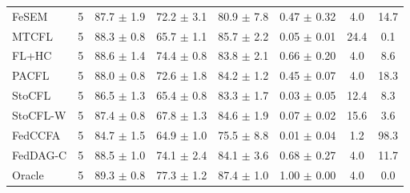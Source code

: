{\begin{tabular}{l r c c c c c c}
FeSEM & 5 & 87.7 $\pm$ 1.9 & 72.2 $\pm$ 3.1 & 80.9 $\pm$ 7.8 & 0.47 $\pm$ 0.32 & 4.0 & 14.7 \\
MTCFL & 5 & 88.3 $\pm$ 0.8 & 65.7 $\pm$ 1.1 & 85.7 $\pm$ 2.2 & 0.05 $\pm$ 0.01 & 24.4 & 0.1 \\
FL+HC & 5 & 88.6 $\pm$ 1.4 & 74.4 $\pm$ 0.8 & 83.8 $\pm$ 2.1 & 0.66 $\pm$ 0.20 & 4.0 & 8.6 \\
PACFL & 5 & 88.0 $\pm$ 0.8 & 72.6 $\pm$ 1.8 & 84.2 $\pm$ 1.2 & 0.45 $\pm$ 0.07 & 4.0 & 18.3 \\
StoCFL & 5 & 86.5 $\pm$ 1.3 & 65.4 $\pm$ 0.8 & 83.3 $\pm$ 1.7 & 0.03 $\pm$ 0.05 & 12.4 & 8.3 \\
StoCFL-W & 5 & 87.4 $\pm$ 0.8 & 67.8 $\pm$ 1.3 & 84.6 $\pm$ 1.9 & 0.07 $\pm$ 0.02 & 15.6 & 3.6 \\
FedCCFA & 5 & 84.7 $\pm$ 1.5 & 64.9 $\pm$ 1.0 & 75.5 $\pm$ 8.8 & 0.01 $\pm$ 0.04 & 1.2 & 98.3 \\
FedDAG-C & 5 & 88.5 $\pm$ 1.0 & 74.1 $\pm$ 2.4 & 84.1 $\pm$ 3.6 & 0.68 $\pm$ 0.27 & 4.0 & 11.7 \\
Oracle & 5 & 89.3 $\pm$ 0.8 & 77.3 $\pm$ 1.2 & 87.4 $\pm$ 1.0 & 1.00 $\pm$ 0.00 & 4.0 & 0.0 \\
\bottomrule
\end{tabular}
}


